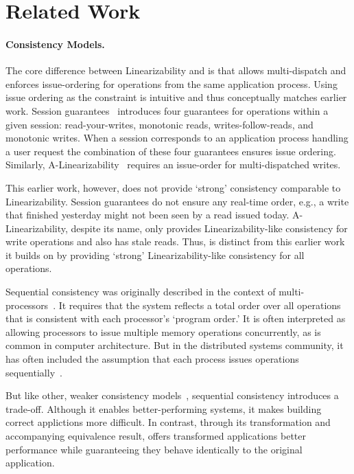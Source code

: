 \section{Related Work}
\label{sec:related}

\paragraph{Consistency Models.}
The core difference between Linearizability and \mdl{} is that \mdl{} allows multi-dispatch and enforces issue-ordering for operations from the same application process.
Using issue ordering as the constraint is intuitive and thus conceptually matches earlier work.
Session guarantees~\cite{terry1994session} introduces four guarantees for operations within a given session: read-your-writes, monotonic reads, writes-follow-reads, and monotonic writes. When a session corresponds to an application process handling a user request the combination of these four guarantees ensures issue ordering.
Similarly, A-Linearizability~\cite{hunt2010zookeeper} requires an issue-order for multi-dispatched writes.

This earlier work, however, does not provide `strong' consistency comparable to Linearizability.
Session guarantees do not ensure any real-time order, e.g., a write that finished yesterday might not been seen by a read issued today.
A-Linearizability, despite its name, only provides Linearizability-like consistency for write operations and also has stale reads.
Thus, \Mdl{} is distinct from this earlier work it builds on by providing `strong' Linearizability-like consistency for all operations.

Sequential consistency was originally described in the context of
multi-processors~\cite{lamport1979sequential}. It requires that
the system reflects a total order over all operations that is 
consistent with each processor's `program order.' It is often
interpreted as allowing processors to issue multiple memory 
operations concurrently, as is common in computer architecture.
But in the distributed systems community, it has often
included the assumption that each process issues operations 
sequentially~\cite{attiya1993seqlin}.

But like other, weaker consistency
models~\cite{ahamad1995causal,lloyd2011cops,terry1995bayou,deCandia2007dynamo}, 
sequential consistency introduces a trade-off. Although it enables
better-performing systems, it makes building correct applictions more difficult. In contrast, through its transformation
and accompanying equivalence result, \MDL{} offers transformed
applications better performance while guaranteeing they behave 
identically to the original application.

